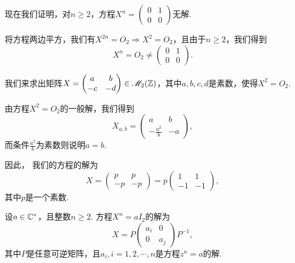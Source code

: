 \begin{example}
  现在我们证明，对$n\ge2$，方程$X^n=\begin{pmatrix}
    0 & 1 \\
    0 & 0
  \end{pmatrix}$无解.

  将方程两边平方，我们有$X^{2n}=O_2\Rightarrow X^2=O_2$，且由于$n\ge2$，我们得到
  \[
    X^n = O_2 \ne \begin{pmatrix}
      0 & 1 \\
      0 & 0
    \end{pmatrix}.
  \]
\end{example}

\begin{example}
  我们来求出矩阵$X=\begin{pmatrix}
    a & b \\
    -c & -d
  \end{pmatrix}\in\mathscr M_2(\mathbb Z)$，其中$a,b,c,d$是素数，使得$X^2=O_2$.

  由方程$X^2=O_2$的一般解，我们得到
  \[
    X_{a,b} = \begin{pmatrix}
      a & b \\
      -\frac{a^2}b & -a
    \end{pmatrix},
  \]
  而条件$\frac{a^2}b$为素数则说明$a=b$.

  因此， 我们的方程的解为
  \[
    X = \begin{pmatrix}
      p & p \\
      -p & -p
    \end{pmatrix} =
    p \begin{pmatrix}
      1 & 1 \\
      -1 & -1
    \end{pmatrix},
  \]
  其中$p$是一个素数.
\end{example}

\begin{theorem}[方程$X^n=aI_2,a\in\MC^\ast,n\ge2$.]

  设$a\in\mathbb C^\ast$，且整数$n\ge2$. 方程$X^n=aI_2$的解为
  \[
    X = P\begin{pmatrix}
      a_i & 0 \\
      0 & a_j
    \end{pmatrix}P^{-1},
  \]
  其中$P$是任意可逆矩阵，且$a_i,i=1,2,\cdots,n$是方程$z^n=a$的解.
\end{theorem}

